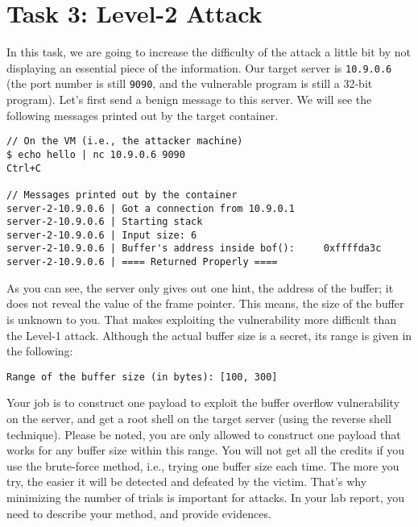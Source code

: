 \section{Task 3: Level-2 Attack} 

In this task, we are going to increase the difficulty
of the attack a little bit by not displaying an essential 
piece of the information. Our target server is 
\texttt{10.9.0.6} (the port number is still \texttt{9090}, and the 
vulnerable program is still a 32-bit program). 
Let's first send a benign message to this server. 
We will see the following messages printed out by the target container. 

\begin{lstlisting}
// On the VM (i.e., the attacker machine)
$ echo hello | nc 10.9.0.6 9090
Ctrl+C

// Messages printed out by the container
server-2-10.9.0.6 | Got a connection from 10.9.0.1
server-2-10.9.0.6 | Starting stack
server-2-10.9.0.6 | Input size: 6
server-2-10.9.0.6 | Buffer's address inside bof():     0xffffda3c
server-2-10.9.0.6 | ==== Returned Properly ====
\end{lstlisting}
 
As you can see, the server only gives out one hint, the 
address of the buffer; it does not reveal the value of the 
frame pointer. This means, the size of the buffer is unknown
to you. That makes exploiting the vulnerability more 
difficult than the Level-1 attack. 
Although the actual buffer size is a secret, its range
is given in the following:

\begin{lstlisting}
Range of the buffer size (in bytes): [100, 300]
\end{lstlisting}
 

Your job is to construct one payload to exploit the buffer overflow
vulnerability on the server, and get a root shell on the target server (using
the reverse shell technique). Please be noted, you are only allowed 
to construct one payload that works for any buffer size 
within this range.  You will not get all the credits if you 
use the brute-force method, i.e., trying one buffer size
each time. The more you try, the easier it will be detected 
and defeated by the victim. That's why minimizing the number 
of trials is important for attacks. 
In your lab report, you need to describe your method, 
and provide evidences.



